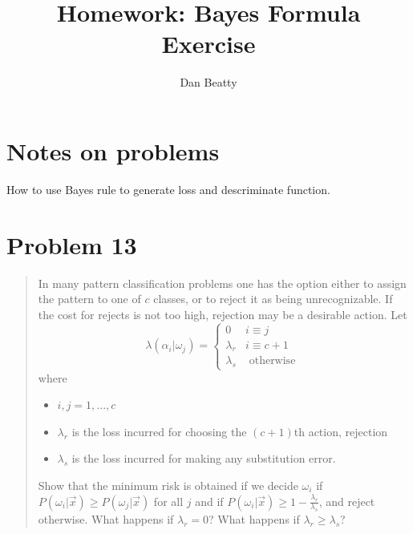 \documentclass[11pt]{article}
\title{Homework: Bayes Formula Exercise}
\author{Dan Beatty}
\begin{document}
\maketitle

\section{Notes on problems}

How to use Bayes rule to generate loss and descriminate function.


\section{Problem 13}
\begin{quote}
	In many pattern classification problems one has the option either to assign the pattern to one of $c$ classes, or to reject it as being unrecognizable.  If the cost for rejects is not too high, rejection may be a desirable action.  Let 
\[
	\lambda ( \alpha _i | \omega_j) = 
\left\{
\begin{array}{ll}
0  &    i \equiv j  \\
\lambda_r  &    i \equiv c + 1  \\
\lambda_s  &   \textrm{ otherwise } 
\end{array}
\right.
\]
where 
\begin{itemize}
\item $i,j = 1,..., c$ 
\item $\lambda_r$ is the loss incurred for choosing the $(c+1)$th action, rejection
\item $\lambda_s$ is the loss incurred for making any substitution error.   
\end{itemize}
Show that the minimum risk is obtained if we decide $\omega_i$ if $P(\omega_i | \vec{x}) \ge P(\omega_j | \vec{x}) $  for all $j$ and if $P(\omega_i | \vec{x})  \ge 1 - \frac{\lambda_r}{\lambda_s} $, and reject otherwise.  What happens if $\lambda_r = 0 $?  What happens if $\lambda_r \ge \lambda_s$?  
\cite[68]{duda-hart-stork}
\end{quote}
\end{document}
